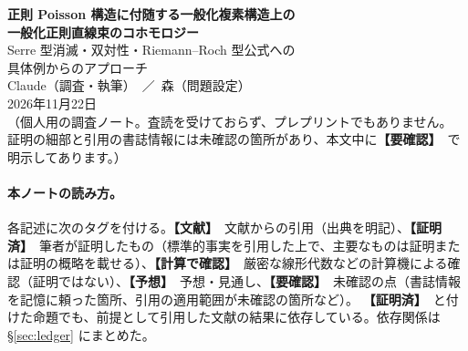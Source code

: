 \documentclass[11pt,a4paper]{article}
\newcommand{\tP}{\textcolor{green!45!black}{\textbf{【証明済】}}}
\newcommand{\tC}{\textcolor{blue!55!black}{\textbf{【文献】}}}
\newcommand{\tV}{\textcolor{violet!80!black}{\textbf{【計算で確認】}}}
\newcommand{\tK}{\textcolor{red!70!black}{\textbf{【予想】}}}
\newcommand{\tQ}{\textcolor{orange!85!black}{\textbf{【要確認】}}}
\theoremstyle{definition}
\newcommand{\Jc}{\mathcal J}
\newcommand{\HH}{\mathrm{HH}}
\begin{document}
\begin{center}
{\LARGE\bfseries\sffamily 正則 Poisson 構造に付随する一般化複素構造上の\\[3pt]一般化正則直線束のコホモロジー}\\[8pt]
{\large Serre 型消滅・双対性・Riemann--Roch 型公式への\\具体例からのアプローチ}\\[12pt]
{\large Claude（調査・執筆）\ ／\ 森（問題設定）}\\[3pt]
2026年11月22日\\[3pt]
{\small （個人用の調査ノート。査読を受けておらず、プレプリントでもありません。\\
証明の細部と引用の書誌情報には未確認の箇所があり、本文中に\tQ\ で明示してあります。）}
\end{center}

\begin{abstract}
\noindent
複素幾何の「三種の神器」（Hirzebruch--Riemann--Roch の定理、Serre の消滅定理、Kodaira の埋め込み定理）の一般化複素幾何版を、最も簡単な非自明な例から攻めるという方針で調べた結果をまとめる。
対象は、正則 Poisson 構造 $\sigma$ から $\beta$-変換で得られる一般化複素構造 $\Jc_\sigma$（$\sigma$ が消える因子 $D$ の上で型が跳ぶ）と、その上の一般化正則直線束 $L$ の一般化 Dolbeault コホモロジー $\HH^*(L)$ である。
主な結果は次の通り。
(1) $\sigma$ が $D$ に沿って対数シンプレクティックのとき、$L$ の一般化正則構造は $D$ に沿った対数的平坦接続と同じものであり、留数 $r_i$ は定数で $c_1(L)=-\sum r_i[D_i]$ となる。
(2) 曲面で $D$ が通常二重点のみをもつ場合、$\HH^k(L)=H^k(X;\mathcal F)\oplus\C^{\mu}[-2]$（$\mathcal F$ は留数で決まる構成可能複体、$\mu$ は二重点の個数）。全 Euler 標数は $\chi(X)$ で $L$ によらず、$L$ への依存は Poincaré 多項式のみに現れる。
(3) 任意次元の射影多様体上の $\beta$-変換構造では、ample な Poisson 加群 $L_0$ について $m\gg0$ のとき横断 Dolbeault 次数 $a>0$ の項が消え、$\HH^k(L_0^m)=0\ (k>n)$ となる（Serre 型定理）。全次数での消滅は $\sigma=0$ でも成り立たない。
(4) 任意のコンパクト複素多様体・任意の正則 Poisson 構造で $\HH^k(L)^*\cong\HH^{2n-k}(L^\vee\otimes K_X^2)$ が成り立つ。
(5) トーリックな場合の weight 公式、4 次元での $\sigma$ の算術への依存、三重点での局所項の計算（一部は予想）。
一般化 Kodaira 埋め込み定理および一般の一般化 Riemann--Roch 公式は得られていない。指数理論的な見通し（b-計算、指標根）は予想の段階である。
\end{abstract}

\paragraph{本ノートの読み方。}
各記述に次のタグを付ける。\tC\ 文献からの引用（出典を明記）、\tP\ 筆者が証明したもの（標準的事実を引用した上で、主要なものは証明または証明の概略を載せる）、\tV\ 厳密な線形代数などの計算機による確認（証明ではない）、\tK\ 予想・見通し、\tQ\ 未確認の点（書誌情報を記憶に頼った箇所、引用の適用範囲が未確認の箇所など）。
\tP\ と付けた命題でも、前提として引用した文献の結果に依存している。依存関係は \S\ref{sec:ledger} にまとめた。

\tableofcontents










\end{document}
